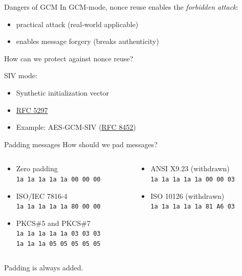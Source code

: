 \begin{frame}{Dangers of GCM}
  In GCM-mode, nonce reuse enables the \emph{forbidden attack}:
  \begin{itemize}[<+(1)->]
    \item practical attack (real-world applicable)
    \item enables message forgery (breaks authenticity)
  \end{itemize}

  \pause
  How can we protect against nonce reuse?

  \pause
  SIV mode:
  \begin{itemize}[<+->]
    \item Synthetic initialization vector
    \item \href{https://datatracker.ietf.org/doc/html/rfc5297}{RFC 5297}
    \item Example: AES-GCM-SIV (\href{https://datatracker.ietf.org/doc/html/rfc8452}{RFC 8452})
  \end{itemize}
\end{frame}

\begin{frame}{Padding messages}
  How should we pad messages?

  \begin{columns}
    \begin{column}{0.5\textwidth}
      \begin{itemize}[<+(1)->]
        \item Zero padding\\
        \texttt{1a 1a 1a 1a 1a 00 00 00}
        \item ISO/IEC 7816-4\\
        \texttt{1a 1a 1a 1a 1a 80 00 00}
        \item PKCS\#5 and PKCS\#7\\
        \texttt{1a 1a 1a 1a 1a 03 03 03}\\
        \texttt{1a 1a 1a 05 05 05 05 05}
      \end{itemize}
    \end{column}
    \begin{column}{0.5\textwidth}
      \begin{itemize}[<+(1)->]
        \item ANSI X9.23 (withdrawn)\\
        \texttt{1a 1a 1a 1a 1a 00 00 03}
        \item ISO 10126 (withdrawn)\\
        \texttt{1a 1a 1a 1a 1a 81 A6 03}
      \end{itemize}
    \end{column}
  \end{columns}

  \vspace*{1em}

  \pause
  Padding is always added.
\end{frame}

